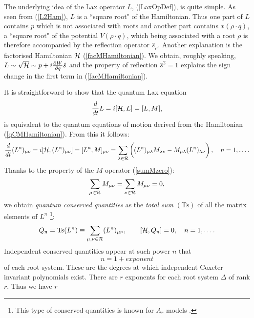 \documentclass[a4paper,12pt]{article}
\begin{document}
The underlying idea of the Lax operator \(L\), (\ref{LaxOpDef}),
is quite simple.
As seen from (\ref{L2Ham}), \(L\) is a ``square root"
of the Hamiltonian.
Thus one part of \(L\) contains \(p\) which is not associated with
roots and another part contains \(x(\rho\cdot q)\), a ``square root"
of the potential
\(V(\rho\cdot q)\), which being associated with a root \(\rho\)
is therefore accompanied by the reflection operator \(\hat{s}_{\rho}\).
Another explanation is the factorised Hamiltonian \({\cal H}\)
(\ref{facMHamiltonian}). We obtain, roughly speaking, \(L\sim\sqrt{\cal
H}\sim p+i{\partial W\over{\partial q}}\hat{s}\) and the property of
reflection
\(\hat{s}^2=1\) explains the sign change in the first term in
(\ref{facMHamiltonian}).


It is straightforward to show that the quantum Lax equation
\begin{equation}
   \label{LaxEquation}
   {d\over dt}{L}=i[{\cal H},L]=[L,{M}],
\end{equation}
is equivalent to the quantum equations of motion derived from the
Hamiltonian (\ref{qCMHamiltonian}). From this it follows:
\begin{equation}
   {d\over{dt}}(L^n)_{\mu\nu}=i[{\cal H},(L^n)_{\mu\nu}]
   =[L^n,M]_{\mu\nu}
   \nonumber\\
   =\sum_{\lambda\in{\cal R}}\left(\phantom{\mbox{\huge
   H}}\hspace{-15pt}
   (L^n)_{\mu\lambda}M_{\lambda\nu}-
   M_{\mu\lambda}(L^n)_{\lambda\nu}\right),\quad
   n=1,\ldots .
\label{qlaxL}
\end{equation}
Thanks to the property of the \(M\) operator
(\ref{sumMzero}):
\[
   \sum_{\mu\in{\cal R}}M_{\mu\nu}=
   \sum_{\nu\in{\cal R}}M_{\mu\nu}=0,
\]
we obtain {\em quantum conserved quantities\/} as the {\em total sum\/}
\((\mbox{Ts})\) of all the
matrix elements of \(L^n\)
\footnote{This type of conserved quantities is known for \(A_r\) models
\cite{ShasSuth,UjWa}.}:
\begin{equation}
   Q_n=\mbox{Ts}(L^n)\equiv\sum_{\mu,\nu\in{\cal R}}(L^n)_{\mu\nu},
  \qquad [{\cal H},Q_n]=0,\quad
   n=1,\ldots.
   \label{qconv}
\end{equation}
Independent conserved quantities appear at such power  \(n\) that
\begin{equation}
   n=1+exponent
\end{equation}
of each root system.
 These are the degrees at which independent Coxeter
invariant polynomials exist.
There are \(r\) exponents for each root system
\(\Delta\) of rank \(r\). Thus we have \(r\)
\end{document}
